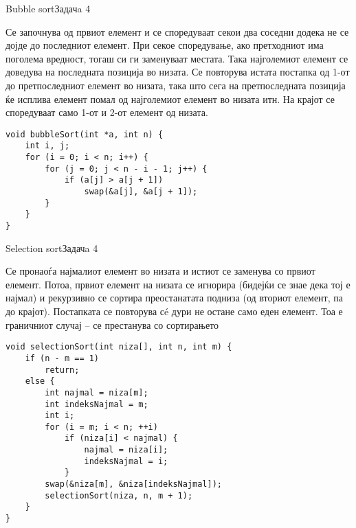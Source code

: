\begin{frame}[fragile]{Bubble sort}{Задачa 4}
\begin{scriptsize}
Се започнува од првиот елемент и се споредуваат секои два соседни додека не се
дојде до последниот елемент. При секое споредување, ако претходниот има поголема
вредност, тогаш си ги заменуваат местата. Така најголемиот елемент се доведува
на последната позиција во низата. Се повторува истата постапка од 1-от до
претпоследниот елемент во низата, така што сега на претпоследната позиција ќе
исплива елемент помал од најголемиот елемент во низата итн. На крајот се
споредуваат само 1-от и 2-от елемент од низата.
\end{scriptsize}
\begin{lstlisting}
void bubbleSort(int *a, int n) {
    int i, j;
    for (i = 0; i < n; i++) {
        for (j = 0; j < n - i - 1; j++) {
            if (a[j] > a[j + 1])
                swap(&a[j], &a[j + 1]);
        }
    }
}
\end{lstlisting}
\end{frame}

\begin{frame}[fragile]{Selection sort}{Задачa 4}
\begin{scriptsize}
Се  пронаоѓа најмалиот елемент во низата и истиот се заменува со првиот елемент.
Потоа, првиот елемент на низата се игнорира (бидејќи се знае дека тој е најмал)
и рекурзивно се сортира преостанатата подниза (од вториот елемент, па до
крајот). Постапката се повторува сé дури не остане само еден елемент. Тоа е
граничниот случај – се престанува со сортирањето
\end{scriptsize}
\begin{lstlisting}
void selectionSort(int niza[], int n, int m) {
    if (n - m == 1)
        return;
    else {
        int najmal = niza[m];
        int indeksNajmal = m;
        int i;
        for (i = m; i < n; ++i)
            if (niza[i] < najmal) {
                najmal = niza[i];
                indeksNajmal = i;
            }
        swap(&niza[m], &niza[indeksNajmal]);
        selectionSort(niza, n, m + 1);
    }
}
\end{lstlisting}
\end{frame}

